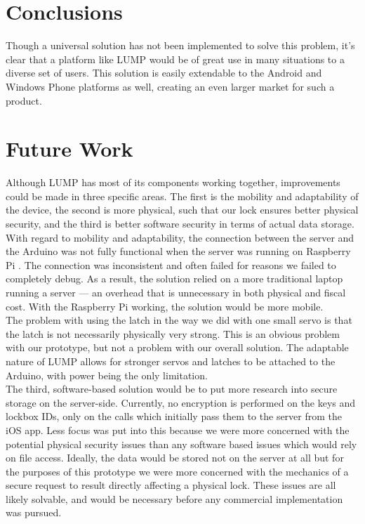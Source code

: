 \documentclass[10pt]{article}
\begin{document}
\begin{multicols}{2}
\section{Conclusions}
Though a universal solution has not been implemented to solve this problem, it's clear that a platform like LUMP would be of great use in many situations to a diverse set of users. This solution is easily extendable to the Android and Windows Phone platforms as well, creating an even larger market for such a product. 

\section{Future Work}
Although LUMP has most of its components working together, improvements could be made in three specific areas. The first is the mobility and adaptability of the device, the second is more physical, such that our lock ensures better physical security, and the third is better software security in terms of actual data storage.\\

With regard to mobility and adaptability, the connection between the server and the Arduino was not fully functional when the server was running on Raspberry Pi \cite{breakfastserialissue}. The connection was inconsistent and often failed for reasons we failed to completely debug. As a result, the solution relied on a more traditional laptop running a server --- an overhead that is unnecessary in both physical and fiscal cost. With the Raspberry Pi working, the solution would be more mobile.\\

The problem with using the latch in the way we did with one small servo is that the latch is not necessarily physically very strong. This is an obvious problem with our prototype, but not a problem with our overall solution. The adaptable nature of LUMP allows for stronger servos and latches to be attached to the Arduino, with power being the only limitation.\\

The third, software-based solution would be to put more research into secure storage on the server-side. Currently, no encryption is performed on the keys and lockbox IDs, only on the calls which initially pass them to the server from the iOS app. Less focus was put into this because we were more concerned with the potential physical security issues than any software based issues which would rely on file access. Ideally, the data would be stored not on the server at all but for the purposes of this prototype we were more concerned with the mechanics of a secure request to result directly affecting a physical lock. These issues are all likely solvable, and would be necessary before any commercial implementation was pursued.\\


\end{multicols}
\end{document}
